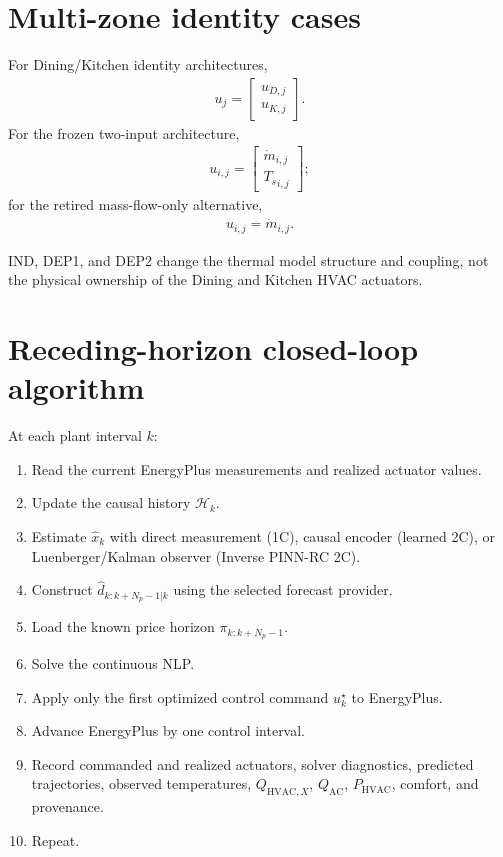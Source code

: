 \documentclass[11pt]{article}
\newcommand{\Ts}{T_s}
\newcommand{\mdot}{\dot m}
\newcommand{\QAC}{Q_{\mathrm{AC}}}
\newcommand{\PHVAC}{P_{\mathrm{HVAC}}}
\begin{document}
\section{Multi-zone identity cases}

For Dining/Kitchen identity architectures,
\begin{align}
u_j
=
\begin{bmatrix}
u_{D,j}\\
u_{K,j}
\end{bmatrix}.
\tag{6.77}
\end{align}
For the frozen two-input architecture,
\begin{align}
u_{i,j}
=
\begin{bmatrix}
\mdot_{i,j}\\
{\Ts}_{i,j}
\end{bmatrix};
\end{align}
for the retired mass-flow-only alternative,
\begin{align}
u_{i,j}=\mdot_{i,j}.
\end{align}

IND, DEP1, and DEP2 change the thermal model structure and coupling, not the physical ownership of
the Dining and Kitchen HVAC actuators.

\section{Receding-horizon closed-loop algorithm}

At each plant interval \(k\):

\begin{enumerate}[leftmargin=2em]
\item Read the current EnergyPlus measurements and realized actuator values.
\item Update the causal history \(\mathcal H_k\).
\item Estimate \(\widehat x_k\) with direct measurement (1C), causal encoder (learned 2C), or
Luenberger/Kalman observer (Inverse PINN-RC 2C).
\item Construct \(\widehat d_{k:k+N_p-1|k}\) using the selected forecast provider.
\item Load the known price horizon \(\pi_{k:k+N_p-1}\).
\item Solve the continuous NLP.
\item Apply only the first optimized control command \(u_k^\star\) to EnergyPlus.
\item Advance EnergyPlus by one control interval.
\item Record commanded and realized actuators, solver diagnostics, predicted trajectories, observed
temperatures, \(Q_{\mathrm{HVAC},X}\), \(\QAC\), \(\PHVAC\), comfort, and provenance.
\item Repeat.
\end{enumerate}
\end{document}
